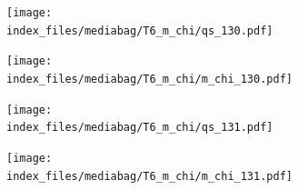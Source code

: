 \documentclass[
  11pt,
  letterpaper,
]{scrreprt}
\begin{document}
\begin{figure}

\begin{minipage}{0.50\linewidth}

\begin{figure}[H]

{\centering \texttt{[image: index\_files/mediabag/T6\_m\_chi/qs\_130.pdf]}

}


\end{figure}%

\end{minipage}%
%
\begin{minipage}{0.50\linewidth}

\begin{figure}[H]

{\centering \texttt{[image: index\_files/mediabag/T6\_m\_chi/m\_chi\_130.pdf]}

}


\end{figure}%

\end{minipage}%

\end{figure}%

\begin{figure}

\begin{minipage}{0.50\linewidth}

\begin{figure}[H]

{\centering \texttt{[image: index\_files/mediabag/T6\_m\_chi/qs\_131.pdf]}

}


\end{figure}%

\end{minipage}%
%
\begin{minipage}{0.50\linewidth}

\begin{figure}[H]

{\centering \texttt{[image: index\_files/mediabag/T6\_m\_chi/m\_chi\_131.pdf]}

}


\end{figure}%

\end{minipage}%

\end{figure}%
\end{document}
